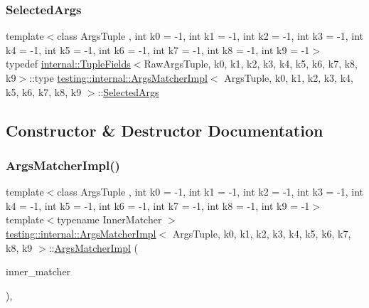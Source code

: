 \subsubsection{\texorpdfstring{SelectedArgs}{SelectedArgs}}
{\footnotesize\ttfamily template$<$class Args\+Tuple , int k0 = -\/1, int k1 = -\/1, int k2 = -\/1, int k3 = -\/1, int k4 = -\/1, int k5 = -\/1, int k6 = -\/1, int k7 = -\/1, int k8 = -\/1, int k9 = -\/1$>$ \\
typedef \mbox{\hyperlink{classtesting_1_1internal_1_1_tuple_fields}{internal\+::\+Tuple\+Fields}}$<$Raw\+Args\+Tuple, k0, k1, k2, k3, k4, k5, k6, k7, k8, k9$>$\+::type \mbox{\hyperlink{classtesting_1_1internal_1_1_args_matcher_impl}{testing\+::internal\+::\+Args\+Matcher\+Impl}}$<$ Args\+Tuple, k0, k1, k2, k3, k4, k5, k6, k7, k8, k9 $>$\+::\mbox{\hyperlink{classtesting_1_1internal_1_1_args_matcher_impl_ab061679f6251e56ccbedaf0c316d00ff}{Selected\+Args}}}



\subsection{Constructor \& Destructor Documentation}
\mbox{\label{classtesting_1_1internal_1_1_args_matcher_impl_a7f7a9a826d130d11fe30633d79f59a06}} 
\subsubsection{\texorpdfstring{ArgsMatcherImpl()}{ArgsMatcherImpl()}}
{\footnotesize\ttfamily template$<$class Args\+Tuple , int k0 = -\/1, int k1 = -\/1, int k2 = -\/1, int k3 = -\/1, int k4 = -\/1, int k5 = -\/1, int k6 = -\/1, int k7 = -\/1, int k8 = -\/1, int k9 = -\/1$>$ \\
template$<$typename Inner\+Matcher $>$ \\
\mbox{\hyperlink{classtesting_1_1internal_1_1_args_matcher_impl}{testing\+::internal\+::\+Args\+Matcher\+Impl}}$<$ Args\+Tuple, k0, k1, k2, k3, k4, k5, k6, k7, k8, k9 $>$\+::\mbox{\hyperlink{classtesting_1_1internal_1_1_args_matcher_impl}{Args\+Matcher\+Impl}} (\begin{DoxyParamCaption}\item[{const Inner\+Matcher \&}]{inner\+\_\+matcher }\end{DoxyParamCaption})\hspace{0.3cm}{\ttfamily [inline]}, {\ttfamily [explicit]}}



